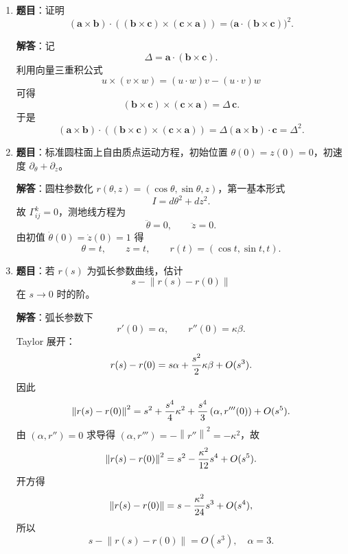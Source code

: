 \documentclass[UTF8,12pt,a4paper]{ctexart}
\newcommand{\vct}[1]{\boldsymbol{#1}}
\newcommand{\norm}[1]{\left\lVert #1\right\rVert}
\newcommand{\inner}[2]{\left(#1,#2\right)}
\begin{document}
\begin{enumerate}
\textbf{解答}：设 $r(s)$ 为弧长参数曲线，Frenet 标架为切向 $\alpha$、主法向 $\beta$、副法向 $\gamma$，则
\[
\boxed{\alpha'=\kappa\beta,\qquad
\beta'=-\kappa\alpha+\tau\gamma,\qquad
\gamma'=-\tau\beta.}
\]
矩阵形式为
\[
{d\over ds}\begin{pmatrix}\alpha\\ \beta\\ \gamma\end{pmatrix}
=
\begin{pmatrix}
0&\kappa&0\\
-\kappa&0&\tau\\
0&-\tau&0
\end{pmatrix}
\begin{pmatrix}\alpha\\ \beta\\ \gamma\end{pmatrix}.
\]

\item \textbf{题目}：证明
\[
(\vct a\times\vct b)\cdot((\vct b\times\vct c)\times(\vct c\times\vct a))
=\bigl(\vct a\cdot(\vct b\times\vct c)\bigr)^2.
\]

\textbf{解答}：记
\[
\Delta=\vct a\cdot(\vct b\times\vct c).
\]
利用向量三重积公式
\[
u\times(v\times w)=(u\cdot w)v-(u\cdot v)w
\]
可得
\[
(\vct b\times\vct c)\times(\vct c\times\vct a)=\Delta\,\vct c.
\]
于是
\[
(\vct a\times\vct b)\cdot((\vct b\times\vct c)\times(\vct c\times\vct a))
=\Delta(\vct a\times\vct b)\cdot\vct c
=\Delta^2.
\]

\item \textbf{题目}：标准圆柱面上自由质点运动方程，初始位置 $\theta(0)=z(0)=0$，初速度 $\partial_\theta+\partial_z$。

\textbf{解答}：圆柱参数化 $r(\theta,z)=(\cos\theta,\sin\theta,z)$，第一基本形式
\[
I=d\theta^2+dz^2.
\]
故 $\Gamma^k_{ij}=0$，测地线方程为
\[
\ddot\theta=0,\qquad \ddot z=0.
\]
由初值 $\dot\theta(0)=\dot z(0)=1$ 得
\[
\boxed{\theta=t,\qquad z=t,\qquad r(t)=(\cos t,\sin t,t).}
\]

\item \textbf{题目}：若 $r(s)$ 为弧长参数曲线，估计
\[
s-\norm{r(s)-r(0)}
\]
在 $s\to0$ 时的阶。

\textbf{解答}：弧长参数下
\[
r'(0)=\alpha,\qquad r''(0)=\kappa\beta.
\]
Taylor 展开：
\[
r(s)-r(0)=s\alpha+{s^2\over2}\kappa\beta+O(s^3).
\]
因此
\[
\norm{r(s)-r(0)}^2=s^2+{s^4\over4}\kappa^2+{s^4\over3}\inner{\alpha}{r'''(0)}+O(s^5).
\]
由 $\inner{\alpha}{r''}=0$ 求导得 $\inner{\alpha}{r'''}=-\norm{r''}^2=-\kappa^2$，故
\[
\norm{r(s)-r(0)}^2=s^2-{\kappa^2\over12}s^4+O(s^5).
\]
开方得
\[
\norm{r(s)-r(0)}=s-{\kappa^2\over24}s^3+O(s^4),
\]
所以
\[
\boxed{s-\norm{r(s)-r(0)}=O(s^3),\quad \alpha=3.}
\]
\end{enumerate}
\end{document}
